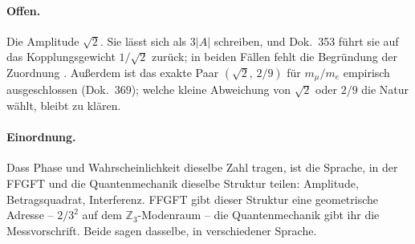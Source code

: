\paragraph{Offen.} Die Amplitude $\sqrt2$. Sie lässt sich als $3|A|$ schreiben, und
Dok.~353 führt sie auf das Kopplungsgewicht $1/\sqrt2$ zurück; in beiden Fällen
fehlt die Begründung der Zuordnung \SM. Außerdem ist das exakte Paar
$(\sqrt2,\,2/9)$ für $m_\mu/m_e$ empirisch ausgeschlossen (Dok.~369); welche kleine
Abweichung von $\sqrt2$ oder $2/9$ die Natur wählt, bleibt zu klären.


\paragraph{Einordnung.} Dass Phase und Wahrscheinlichkeit dieselbe Zahl tragen, ist die Sprache,
in der FFGFT und die Quantenmechanik dieselbe Struktur teilen: Amplitude, Betragsquadrat,
Interferenz. FFGFT gibt dieser Struktur eine geometrische Adresse -- $2/3^2$ auf dem
$\mathbb{Z}_3$-Modenraum -- die Quantenmechanik gibt ihr die Messvorschrift. Beide sagen dasselbe,
in verschiedener Sprache.
